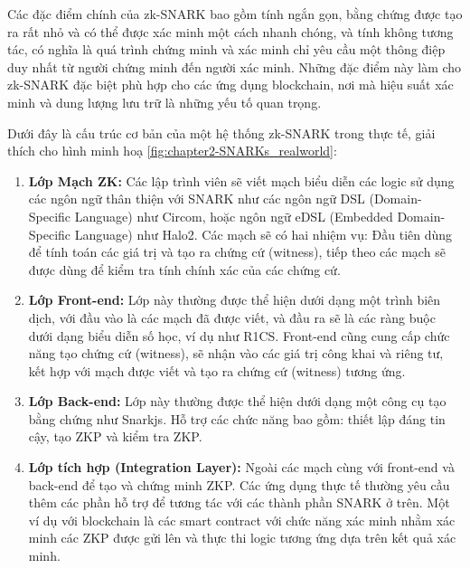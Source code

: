 Các đặc điểm chính của zk-SNARK bao gồm tính ngắn gọn, bằng chứng được tạo ra rất nhỏ và có thể được xác minh một cách nhanh chóng, và tính không tương tác, có nghĩa là quá trình chứng minh và xác minh chỉ yêu cầu một thông điệp duy nhất từ người chứng minh đến người xác minh. Những đặc điểm này làm cho zk-SNARK đặc biệt phù hợp cho các ứng dụng blockchain, nơi mà hiệu suất xác minh và dung lượng lưu trữ là những yếu tố quan trọng.

Dưới đây là cấu trúc cơ bản của một hệ thống zk-SNARK trong thực tế, giải thích cho hình minh hoạ \ref{fig:chapter2-SNARKs_realworld}:
\begin{enumerate}
    \item \textbf{Lớp Mạch ZK:} Các lập trình viên sẽ viết mạch biểu diễn các logic sử dụng các ngôn ngữ thân thiện với SNARK như các ngôn ngữ DSL (Domain-Specific Language) như Circom, hoặc ngôn ngữ eDSL (Embedded Domain-Specific Language) như Halo2. Các mạch sẽ có hai nhiệm vụ: Đầu tiên dùng để tính toán các giá trị và tạo ra chứng cứ (witness), tiếp theo các mạch sẽ được dùng để kiểm tra tính chính xác của các chứng cứ.
    \item \textbf{Lớp Front-end:} Lớp này thường được thể hiện dưới dạng một trình biên dịch, với đầu vào là các mạch đã được viết, và đầu ra sẽ là các ràng buộc dưới dạng biểu diễn số học, ví dụ như R1CS. Front-end cũng cung cấp chức năng tạo chứng cứ (witness), sẽ nhận vào các giá trị công khai và riêng tư, kết hợp với mạch được viết và tạo ra chứng cứ (witness) tương ứng.
    \item \textbf{Lớp Back-end:} Lớp này thường được thể hiện dưới dạng một công cụ tạo bằng chứng như Snarkjs. Hỗ trợ các chức năng bao gồm: thiết lập đáng tin cậy, tạo ZKP và kiểm tra ZKP.
    \item \textbf{Lớp tích hợp (Integration Layer):} Ngoài các mạch cùng với front-end và back-end để tạo và chứng minh ZKP. Các ứng dụng thực tế thường yêu cầu thêm các phần hỗ trợ để tương tác với các thành phần SNARK ở trên. Một ví dụ với blockchain là các smart contract với chức năng xác minh nhằm xác minh các ZKP được gửi lên và thực thi logic tương ứng dựa trên kết quả xác minh.
\end{enumerate}

